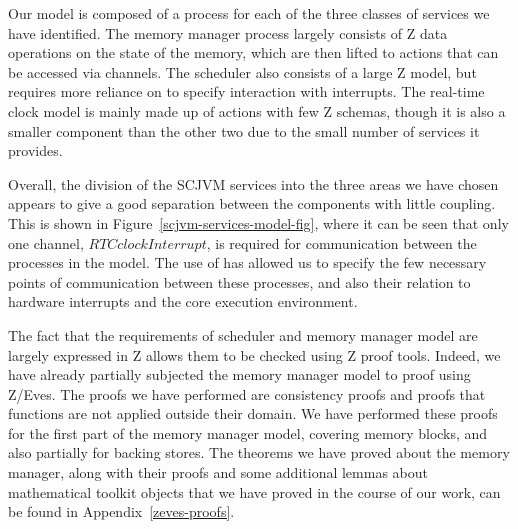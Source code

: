 Our model is composed of a \Circus{} process for each of the three
classes of services we have identified.
The memory manager process largely consists of Z data operations on
the state of the memory, which are then lifted to \Circus{} actions
that can be accessed via channels.
The scheduler also consists of a large Z model, but requires more
reliance on \Circus{} to specify interaction with interrupts.
The real-time clock model is mainly made up of \Circus{} actions with
few Z schemas, though it is also a smaller component than the other
two due to the small number of services it provides.

Overall, the division of the SCJVM services into the three areas we
have chosen appears to give a good separation between the components
with little coupling.
This is shown in Figure~\ref{scjvm-services-model-fig}, where it can
be seen that only one channel, $RTCclockInterrupt$, is required for
communication between the processes in the model.
The use of \Circus{} has allowed us to specify the few necessary
points of communication between these processes, and also their
relation to hardware interrupts and the core execution environment.

The fact that the requirements of scheduler and memory manager model
are largely expressed in Z allows them to be checked using Z proof
tools.
Indeed, we have already partially subjected the memory manager model
to proof using Z/Eves.
The proofs we have performed are consistency proofs and proofs that
functions are not applied outside their domain.
We have performed these proofs for the first part of the memory
manager model, covering memory blocks, and also partially for backing
stores.
The theorems we have proved about the memory manager, along with their
proofs and some additional lemmas about mathematical toolkit objects
that we have proved in the course of our work, can be found in
Appendix~\ref{zeves-proofs}.

